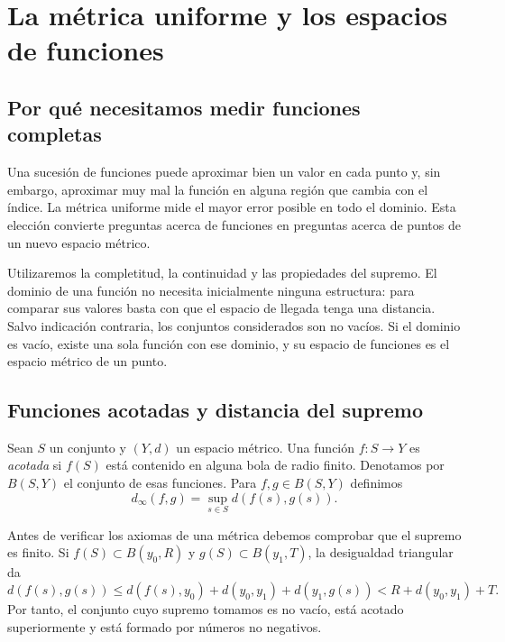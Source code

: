 \chapter{La métrica uniforme y los espacios de funciones}\label{chap:25}

\section{Por qué necesitamos medir funciones completas}
Una sucesión de funciones puede aproximar bien un valor en cada punto y, sin embargo, aproximar muy mal la función en alguna región que cambia con el índice. La métrica uniforme mide el mayor error posible en todo el dominio. Esta elección convierte preguntas acerca de funciones en preguntas acerca de puntos de un nuevo espacio métrico.

Utilizaremos la completitud, la continuidad y las propiedades del supremo. El dominio de una función no necesita inicialmente ninguna estructura: para comparar sus valores basta con que el espacio de llegada tenga una distancia. Salvo indicación contraria, los conjuntos considerados son no vacíos. Si el dominio es vacío, existe una sola función con ese dominio, y su espacio de funciones es el espacio métrico de un punto.

\section{Funciones acotadas y distancia del supremo}
\begin{definicion}
Sean $S$ un conjunto y $(Y,d)$ un espacio métrico. Una función $f:S\to Y$ es \emph{acotada} si $f(S)$ está contenido en alguna bola de radio finito. Denotamos por $B(S,Y)$ el conjunto de esas funciones. Para $f,g\in B(S,Y)$ definimos
\[
 d_\infty(f,g)=\sup_{s\in S}d(f(s),g(s)).
\]
\end{definicion}

Antes de verificar los axiomas de una métrica debemos comprobar que el supremo es finito. Si $f(S)\subset B(y_0,R)$ y $g(S)\subset B(y_1,T)$, la desigualdad triangular da
\[
 d(f(s),g(s))\le d(f(s),y_0)+d(y_0,y_1)+d(y_1,g(s))
 <R+d(y_0,y_1)+T.
\]
Por tanto, el conjunto cuyo supremo tomamos es no vacío, está acotado superiormente y está formado por números no negativos.

